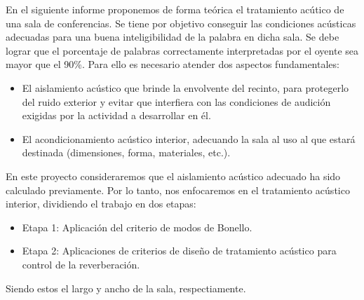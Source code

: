 En el siguiente informe proponemos de forma teórica el tratamiento acútico de una sala de conferencias. Se tiene por objetivo conseguir las condiciones acústicas adecuadas para una buena
inteligibilidad de la palabra en dicha sala. Se debe lograr que el porcentaje de palabras correctamente interpretadas por el oyente sea mayor que el 90\%.
Para ello es necesario atender dos aspectos fundamentales:

\begin{itemize}
\item El aislamiento acústico que brinde la envolvente del recinto, para protegerlo del ruido exterior y evitar que interfiera con las condiciones de audición exigidas por la actividad a desarrollar en él.
\item El acondicionamiento acústico interior, adecuando la sala al uso al que estará destinada (dimensiones, forma, materiales, etc.).

\end{itemize}

En este proyecto consideraremos que el aislamiento acústico adecuado ha sido calculado previamente. Por lo tanto, nos enfocaremos en el tratamiento acústico interior, dividiendo el trabajo en dos etapas:\\

\begin{itemize}
    \item Etapa 1: Aplicación del criterio de modos de Bonello.
    \item Etapa 2: Aplicaciones de criterios de diseño de tratamiento acústico para control de la reverberación.
\end{itemize}


Siendo estos el largo y ancho de la sala, respectiamente.
\hspace{1cm}

